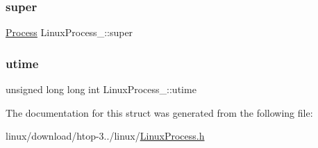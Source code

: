 \subsubsection{\texorpdfstring{super}{super}}
{\footnotesize\ttfamily \hyperlink{Process_8h_a20673e8fa40981a168bf0e196c4cef3b}{Process} Linux\+Process\+\_\+\+::super}

\mbox{\label{structLinuxProcess___a75516dac31570653ea0101b4a631d7d5}} 
\subsubsection{\texorpdfstring{utime}{utime}}
{\footnotesize\ttfamily unsigned long long int Linux\+Process\+\_\+\+::utime}



The documentation for this struct was generated from the following file\+:\begin{DoxyCompactItemize}
\item 
linux/download/htop-\/3../linux/\hyperlink{LinuxProcess_8h}{Linux\+Process.\+h}\end{DoxyCompactItemize}
